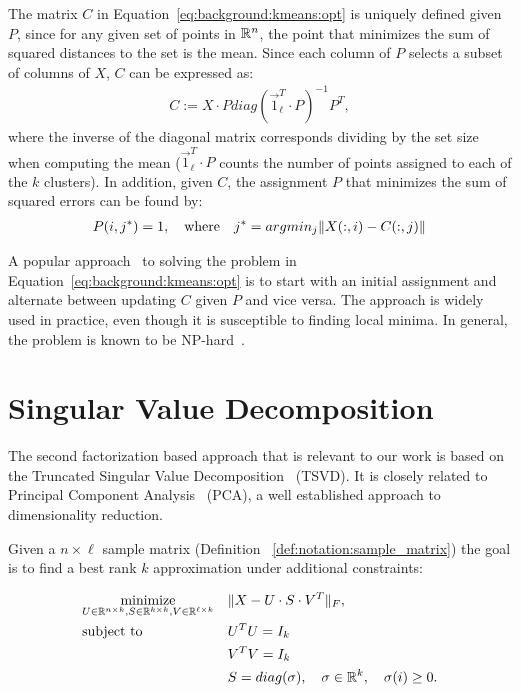 The matrix $C$ in Equation~\ref{eq:background:kmeans:opt} is uniquely defined given $P$, since for any given set
of points in $\mathbb{R}^n$, the point that minimizes the sum of squared distances to the set is the mean. Since each
column of $P$ selects a subset of columns of $X$, $C$ can be expressed as:
\begin{equation}\label{eq:background:kmeans:centroids}
\begin{aligned}
 C := X\cdot P diag(\vec{1}_\ell^T \cdot P)^{-1} P^T,
\end{aligned}
\end{equation}
where the inverse of the diagonal matrix corresponds dividing by the set size when computing the mean ($\vec{1}_\ell^T \cdot P$ counts
the number of points assigned to each of the $k$ clusters). In addition, given $C$, the assignment $P$ that
minimizes the sum of squared errors can be found by:
\begin{equation}\label{eq:background:kmeans:assignments}
\begin{aligned}
P(i, j^*) = 1,\quad \textnormal{where}\quad j^* = argmin_j \lVert X(:,i) - C(:,j)\rVert
\end{aligned}
\end{equation}

A popular approach~\cite{kmeans} to solving the problem in Equation~\ref{eq:background:kmeans:opt} is to start with an initial assignment and alternate between updating $C$ given $P$ and vice
versa. The approach is widely used in practice, even though it is susceptible to finding local minima. In general, the problem is known to be NP-hard~\cite{aloise2009np}.

\section{Singular Value Decomposition}\label{chap:background:svd}

The second factorization based approach that is relevant to our work is based on the Truncated Singular Value Decomposition~\cite{golub} (TSVD). It is closely
related to Principal Component Analysis~\cite{Pearson1901On} (PCA), a well established approach to dimensionality reduction.

Given a $n \times \ell$ sample matrix (Definition ~\ref{def:notation:sample_matrix})
the goal is to find a best rank $k$ approximation under additional constraints:

\begin{equation}\label{eq:background:svd:opt}
\begin{aligned}
& \underset{U \in \mathbb{R}^{n \times k}, S \in \mathbb{R}^{k \times k}, V \in \mathbb{R}^{\ell \times k}}{\text{minimize}}
& & \lVert X - U \cdot S \cdot V^T\rVert_F, \\
& \text{subject to}
& & U^TU = I_k \\
& & & V^TV = I_k \\
& & & S = diag(\sigma), \quad \sigma \in \mathbb{R}^k, \quad \sigma(i) \geq 0.
\end{aligned}
\end{equation}

